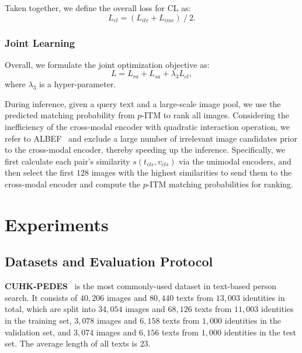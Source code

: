 \documentclass{article}
\begin{document}
Taken together, we define the overall loss for CL as:
\begin{equation}
    L_{cl} = (L_{itc} + L_{imc})\ /\ 2. \label{equ10}
\end{equation}





\subsubsection{Joint Learning}
Overall, we formulate the joint optimization objective as:
\begin{equation}
    L = L_{ra} + L_{sa} + \lambda_3L_{cl}, \label{equ11}
\end{equation}
where $\lambda_3$ is a hyper-parameter.

During inference, given a query text and a large-scale image pool, we use the predicted matching probability from $p$-ITM to rank all images. 
Considering the inefficiency of the cross-modal encoder with quadratic interaction operation, we refer to ALBEF~\cite{NEURIPS2021_50525975} and exclude a large number of irrelevant image candidates prior to the cross-modal encoder, thereby speeding up the inference.
Specifically, we first calculate each pair's similarity $s(t_{cls}, v_{cls})$ via the unimodal encoders, and then select the first $128$ images with the highest similarities to send them to the cross-modal encoder and compute the $p$-ITM matching probabilities for ranking.


\section{Experiments}

\iffalse
\subsection{Datasets and Evaluation Protocol}
\textbf{CUHK-PEDES}~\cite{li2017person} is the most commonly-used dataset in text-based person search. It consists of $40,206$ images and $80,440$ texts from $13,003$ identities in total, which are split into $34,054$ images and $68,126$ texts from $11,003$ identities in the training set, $3,078$ images and $6,158$ texts from $1,000$ identities in the validation set, and $3,074$ images and $6,156$ texts from $1,000$ identities in the test set. The average length of all texts is $23$. 
\end{document}
